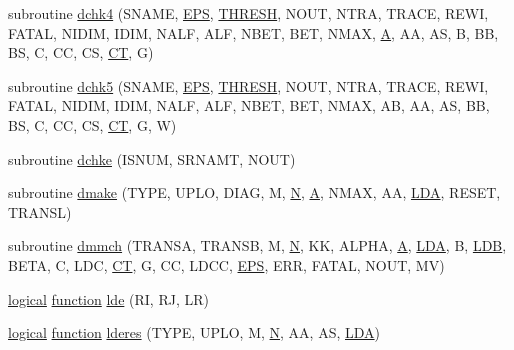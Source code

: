 \begin{DoxyCompactItemize}
\item 
subroutine \hyperlink{dblat3_8f_a72a88839f0a0ccb0bb37b2c3785b6bcd}{dchk4} (S\+N\+A\+M\+E, \hyperlink{tukey_8c_a6ebf6899d6c1c8b7b9d09be872c05aae}{E\+P\+S}, \hyperlink{zlaqgs_8c_a0656018abfc9fa2821827415f5d5ea57}{T\+H\+R\+E\+S\+H}, N\+O\+U\+T, N\+T\+R\+A, T\+R\+A\+C\+E, R\+E\+W\+I, F\+A\+T\+A\+L, N\+I\+D\+I\+M, I\+D\+I\+M, N\+A\+L\+F, A\+L\+F, N\+B\+E\+T, B\+E\+T, N\+M\+A\+X, \hyperlink{classA}{A}, A\+A, A\+S, B, B\+B, B\+S, C, C\+C, C\+S, \hyperlink{tau_8h_ae9ab3801c1afb4f20cfd669d76aec283}{C\+T}, G)
\item 
subroutine \hyperlink{dblat3_8f_a353d76f8b6caa9e3455f6ffb24599c80}{dchk5} (S\+N\+A\+M\+E, \hyperlink{tukey_8c_a6ebf6899d6c1c8b7b9d09be872c05aae}{E\+P\+S}, \hyperlink{zlaqgs_8c_a0656018abfc9fa2821827415f5d5ea57}{T\+H\+R\+E\+S\+H}, N\+O\+U\+T, N\+T\+R\+A, T\+R\+A\+C\+E, R\+E\+W\+I, F\+A\+T\+A\+L, N\+I\+D\+I\+M, I\+D\+I\+M, N\+A\+L\+F, A\+L\+F, N\+B\+E\+T, B\+E\+T, N\+M\+A\+X, A\+B, A\+A, A\+S, B\+B, B\+S, C, C\+C, C\+S, \hyperlink{tau_8h_ae9ab3801c1afb4f20cfd669d76aec283}{C\+T}, G, W)
\item 
subroutine \hyperlink{dblat3_8f_a9e9fa2f6b42c5bbdde09d50fffaafc4e}{dchke} (I\+S\+N\+U\+M, S\+R\+N\+A\+M\+T, N\+O\+U\+T)
\item 
subroutine \hyperlink{dblat3_8f_ad997f0c77eaef4f4af90920624ed1456}{dmake} (T\+Y\+P\+E, U\+P\+L\+O, D\+I\+A\+G, M, \hyperlink{polmisc_8c_a0240ac851181b84ac374872dc5434ee4}{N}, \hyperlink{classA}{A}, N\+M\+A\+X, A\+A, \hyperlink{example__user_8c_ae946da542ce0db94dced19b2ecefd1aa}{L\+D\+A}, R\+E\+S\+E\+T, T\+R\+A\+N\+S\+L)
\item 
subroutine \hyperlink{dblat3_8f_aaac459b4d9b9dbefc70b68d0bf0e7a3f}{dmmch} (T\+R\+A\+N\+S\+A, T\+R\+A\+N\+S\+B, M, \hyperlink{polmisc_8c_a0240ac851181b84ac374872dc5434ee4}{N}, K\+K, A\+L\+P\+H\+A, \hyperlink{classA}{A}, \hyperlink{example__user_8c_ae946da542ce0db94dced19b2ecefd1aa}{L\+D\+A}, B, \hyperlink{example__user_8c_a50e90a7104df172b5a89a06c47fcca04}{L\+D\+B}, B\+E\+T\+A, C, L\+D\+C, \hyperlink{tau_8h_ae9ab3801c1afb4f20cfd669d76aec283}{C\+T}, G, C\+C, L\+D\+C\+C, \hyperlink{tukey_8c_a6ebf6899d6c1c8b7b9d09be872c05aae}{E\+P\+S}, E\+R\+R, F\+A\+T\+A\+L, N\+O\+U\+T, M\+V)
\item 
\hyperlink{tnc_8c_aa7b64cdf39500931f7b333343791a104}{logical} \hyperlink{afunc_8m_a7b5e596df91eadea6c537c0825e894a7}{function} \hyperlink{dblat3_8f_a6fd3ddbe863b9e8e6e79ebf9c8594174}{lde} (R\+I, R\+J, L\+R)
\item 
\hyperlink{tnc_8c_aa7b64cdf39500931f7b333343791a104}{logical} \hyperlink{afunc_8m_a7b5e596df91eadea6c537c0825e894a7}{function} \hyperlink{dblat3_8f_aa4dbbdcda5788166d5b19bb77e08cdbb}{lderes} (T\+Y\+P\+E, U\+P\+L\+O, M, \hyperlink{polmisc_8c_a0240ac851181b84ac374872dc5434ee4}{N}, A\+A, A\+S, \hyperlink{example__user_8c_ae946da542ce0db94dced19b2ecefd1aa}{L\+D\+A})

\end{DoxyCompactItemize}
